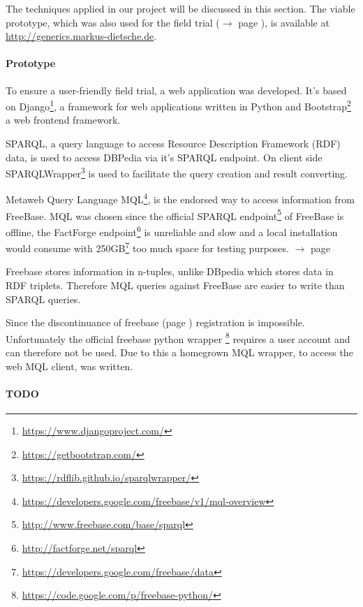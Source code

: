 \documentclass[11pt,titlepage,oneside,openany]{book}
\begin{document}
The techniques applied in our project will be discussed in this section. The viable prototype, which was also used for the field trial ($\rightarrow$ page \pageref{field_trial}), is available at \url{http://generics.markus-dietsche.de}.

\paragraph{Prototype}
\label{prototype}


To ensure a user-friendly field trial, a web application was developed. It's based on 
Django\footnote{\url{https://www.djangoproject.com/}}, a framework for web applications written in Python and Bootstrap\footnote{\url{https://getbootstrap.com/}} a web frontend framework.

SPARQL, a query language to access Resource Description Framework (RDF) data, is used to access DBPedia via it's SPARQL endpoint. On client side SPARQLWrapper\footnote{\url{https://rdflib.github.io/sparqlwrapper/}} is used to facilitate the query creation and result converting. 


Metaweb Query Language MQL\footnote{\url{https://developers.google.com/freebase/v1/mql-overview}}, is the endorsed way to access information from FreeBase. MQL was chosen since the official SPARQL endpoint\footnote{\url{http://www.freebase.com/base/sparql}} of FreeBase is offline, the FactForge endpoint\footnote{\url{http://factforge.net/sparql}} is unreliable and slow and a local installation would consume with 250GB\footnote{\url{https://developers.google.com/freebase/data}} too much space for testing purposes. $\rightarrow$ page \pageref{}


Freebase stores information in n-tuples, unlike DBpedia which stores data in RDF triplets. Therefore MQL queries against FreeBase are easier to write than SPARQL queries.


Since the discontinuance of freebase (page \pageref{prob:freebase}) registration is impossible. Unfortunately the official freebase python wrapper \footnote{\url{https://code.google.com/p/freebase-python/}} requires a user account and can therefore not be used. Due to this a homegrown MQL wrapper, to access the web MQL client, was written.



  \paragraph{TODO}
\label{TODO}
\end{document}
